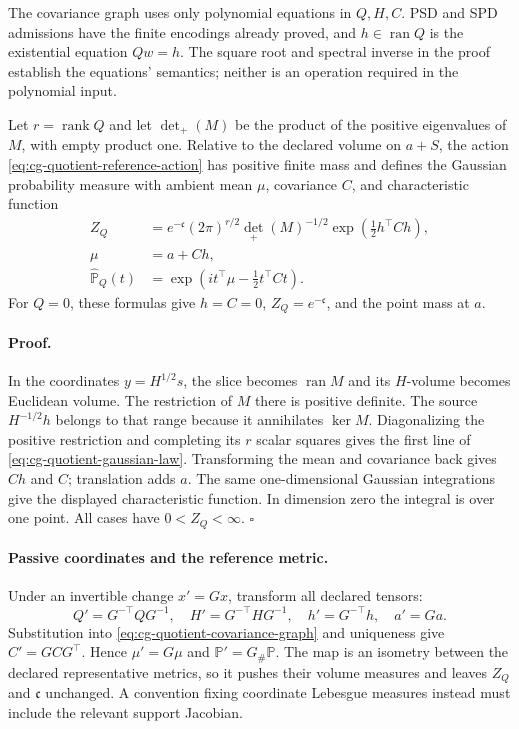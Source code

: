 The covariance graph uses only polynomial equations in
\(Q,H,C\). PSD and SPD admissions have the finite
encodings already proved, and \(h\in\operatorname{ran}Q\)
is the existential equation \(Qw=h\).
The square root and spectral inverse in the proof
establish the equations' semantics; neither is an
operation required in the polynomial input.

Let \(r=\operatorname{rank}Q\) and let
\(\det_+(M)\) be the product of the positive eigenvalues
of \(M\), with empty product one. Relative to the
declared volume on \(a+S\), the action
\eqref{eq:cg-quotient-reference-action} has positive
finite mass and defines the Gaussian probability
measure with ambient mean \(\mu\), covariance \(C\),
and characteristic function
\begin{equation}
\begin{aligned}
Z_Q&=e^{-\mathfrak c}(2\pi)^{r/2}
       \det_+(M)^{-1/2}
       \exp\left(\frac12h^\top Ch\right),\\
\mu&=a+Ch,\\
\widehat{\mathbb P}_Q(t)
 &=\exp\left(i t^\top\mu-\frac12t^\top Ct\right).
\end{aligned}
\label{eq:cg-quotient-gaussian-law}
\end{equation}
For \(Q=0\), these formulas give \(h=C=0\),
\(Z_Q=e^{-\mathfrak c}\), and the point mass at \(a\).

\paragraph{Proof.}
In the coordinates \(y=H^{1/2}s\), the slice becomes
\(\operatorname{ran}M\) and its \(H\)-volume becomes
Euclidean volume. The restriction of \(M\) there is
positive definite. The source \(H^{-1/2}h\) belongs to
that range because it annihilates \(\ker M\).
Diagonalizing the positive restriction and completing
its \(r\) scalar squares gives the first line of
\eqref{eq:cg-quotient-gaussian-law}. Transforming the
mean and covariance back gives \(Ch\) and \(C\);
translation adds \(a\). The same one-dimensional
Gaussian integrations give the displayed characteristic
function. In dimension zero the integral is over one
point. All cases have \(0<Z_Q<\infty\).
\(\square\)

\paragraph{Passive coordinates and the reference metric.}
Under an invertible change \(x'=Gx\), transform all
declared tensors:
\begin{equation}
Q'=G^{-\top}QG^{-1},\quad
H'=G^{-\top}HG^{-1},\quad
h'=G^{-\top}h,\quad a'=Ga.
\label{eq:cg-quotient-gauge-data}
\end{equation}
Substitution into
\eqref{eq:cg-quotient-covariance-graph} and uniqueness
give \(C'=GCG^\top\). Hence \(\mu'=G\mu\) and
\(\mathbb P' =G_\#\mathbb P\). The map is an isometry
between the declared representative metrics, so it
pushes their volume measures and leaves \(Z_Q\) and
\(\mathfrak c\) unchanged. A convention fixing coordinate
Lebesgue measures instead must include the relevant
support Jacobian.

